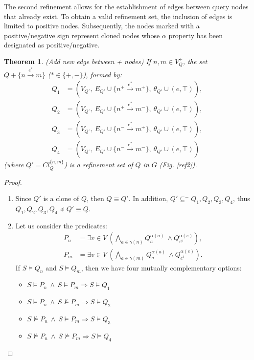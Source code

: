 \documentclass[mathematics,article,submit,pdftex,moreauthors]{Definitions/mdpi}
\newtheorem{theorem}{Theorem}
\begin{document}
The second refinement allows for the establishment of edges between query nodes that already exist. To obtain a valid refinement set, the inclusion of edges is limited to positive nodes. Subsequently, the nodes marked with a positive/negative sign represent cloned nodes whose $\alpha$ property has been designated as positive/negative.

\begin{theorem}{(Add new edge between + nodes)}
    If $n,m\in V_Q^+$, the set $Q+\{n\stackrel {e^*}{\longrightarrow} m\}$ ($*\in\{+,-\}$), formed by:
    \begin{align*}
    Q_1 &= (V_{Q'},\ E_{Q'}\cup\{n^+\stackrel {e^*}{\longrightarrow} m^+\},\ \theta_{Q'}\cup(e,\top)), \\
    Q_2 &= (V_{Q'},\ E_{Q'}\cup\{n^+\stackrel {e^*}{\longrightarrow} m^-\},\ \theta_{Q'}\cup(e,\top)), \\
    Q_3 &= (V_{Q'},\ E_{Q'}\cup\{n^-\stackrel {e^*}{\longrightarrow} m^+\},\ \theta_{Q'}\cup(e,\top)), \\
    Q_4 &= (V_{Q'},\ E_{Q'}\cup\{n^-\stackrel {e^*}{\longrightarrow} m^-\},\ \theta_{Q'}\cup(e,\top))
\end{align*}
    (where $Q'=Cl_Q^{\{n,m\}}$) is a refinement set of $Q$ in $G$ (Fig. \ref{ref2}).
\end{theorem}
\begin{proof}{}
	\quad
	\begin{enumerate}
		\item Since $Q'$ is a clone of $Q$, then $Q\equiv Q'$. In addition,  $Q'\subseteq^- Q_1,Q_2,Q_3,Q_4$, thus $Q_1,Q_2,Q_3,Q_4\preceq Q'\equiv Q$.
		\item Let us consider the predicates:
		\begin{align*}
		P_n &= \exists v\in V\ \left( \bigwedge_{a\in \gamma(n)} Q_a^{\alpha(a)}\ \wedge Q_{e^o}^{\alpha(e)}\right), \\
		P_m &= \exists v\in V\ \left( \bigwedge_{a\in \gamma(m)} Q_a^{\alpha(a)}\ \wedge Q_{e^i}^{\alpha(e)}\right).
		\end{align*}
		If $S\vDash Q_n$ and $S\vDash Q_m$, then we have four mutually complementary options:
		\begin{itemize}
			\item $S\vDash P_n\ \wedge\ S\vDash P_m \Rightarrow S\vDash Q_1$
			\item $S\vDash P_n\ \wedge\ S\nvDash P_m \Rightarrow S\vDash Q_2$
			\item $S\nvDash P_n\ \wedge\ S\vDash P_m \Rightarrow S\vDash Q_3$
			\item $S\nvDash P_n\ \wedge\ S\nvDash P_m \Rightarrow S\vDash Q_4$
		\end{itemize}
	\end{enumerate}
\end{proof}
\end{document}
